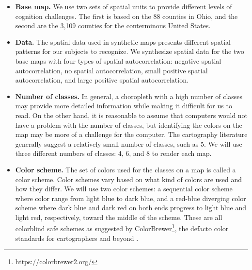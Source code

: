 
\begin{itemize}
    \item {\bf Base map.} We use two sets of spatial units to provide different levels of cognition challenges. The first is based on the 88 counties in Ohio, and the second are the 3,109 counties for the conterminous United States.

    \item {\bf Data.} The spatial data used in synthetic maps presents different spatial patterns for our subjects to recognize. We synthesize spatial data for the two base maps with four types of spatial autocorrelation: negative spatial autocorrelation, no spatial autocorrelation, small positive spatial autocorrelation, and large positive spatial autocorrelation.

    \item {\bf Number of classes.} In general, a choropleth with a high number of classes may provide more detailed information while making it difficult for us to read. On the other hand, it is reasonable to assume that computers would not have a problem with the number of classes, but identifying the colors on the map may be more of a challenge for the computer. The cartography literature generally suggest a relatively small number of classes, such as 5. We will use three different numbers of classes: 4, 6, and 8 to render each map.

    \item {\bf Color scheme.} The set of colors used for the classes on a map is called a color scheme. Color schemes vary based on what kind of colors are used and how they differ. We will use two color schemes: a sequential color scheme where color range from light blue to dark blue, and a red-blue diverging color scheme where dark blue and dark red on both ends progress to light blue and light red, respectively, toward the middle of the scheme. These are all colorblind safe schemes as suggested by ColorBrewer\footnote{https://colorbrewer2.org/}, the defacto color standards for cartographers and beyond \citep{harrower2003colorbrewer}.
\end{itemize}

